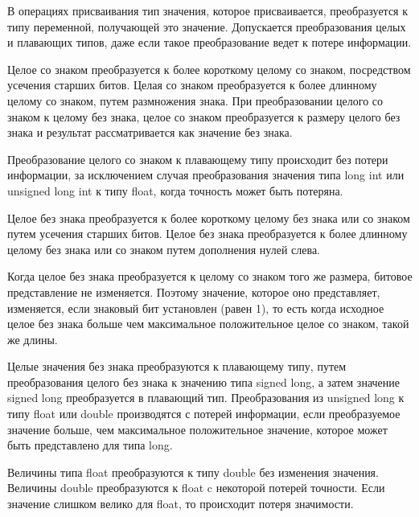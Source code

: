 В операциях присваивания тип значения, которое присваивается, преобразуется к типу переменной, получающей это значение. Допускается преобразования целых и плавающих типов, даже если такое преобразование ведет к потере информации. \killoverfullbefore \BL 

\clearpage

 \BL

Целое со знаком преобразуется к более короткому целому со знаком, посредством усечения старших битов. Целая со знаком преобразуется к более длинному целому со знаком, путем размножения знака. При преобразовании целого со знаком к целому без знака, целое со знаком преобразуется к размеру целого без знака и результат рассматривается как значение без знака. 

Преобразование целого со знаком к плавающему типу происходит без потери информации, за исключением случая преобразования значения типа long int или unsigned long int к типу float, когда точность может быть потеряна. 

Целое без знака преобразуется к более короткому целому без знака или со знаком путем усечения старших битов. Целое без знака преобразуется к более длинному целому без знака или со знаком путем дополнения нулей слева. 

Когда целое без знака преобразуется к целому со знаком того же размера, битовое представление не изменяется. Поэтому значение, которое оно представляет, изменяется, если знаковый бит установлен (равен 1), то есть когда исходное целое без знака больше чем максимальное положительное целое со знаком, такой же длины. 

Целые значения без знака преобразуются к плавающему типу, путем преобразования целого без знака к значению типа signed long, а затем значение signed long преобразуется в плавающий тип. Преобразования из unsigned long к типу float или double производятся с потерей информации, если преобразуемое значение больше, чем максимальное положительное значение, которое может быть представлено для типа long. \killoverfullbefore \BL 

 \BL

Величины типа float преобразуются к типу double без изменения значения. Величины double  преобразуются к float c некоторой потерей точности. Если значение слишком велико для float, то происходит потеря значимости. 

